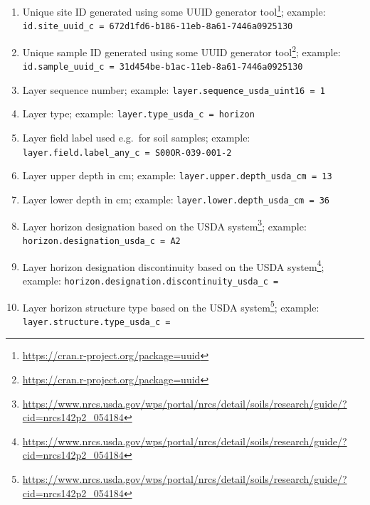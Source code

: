 \documentclass[
  graybox,natbib,nospthms]{svmono}
\providecommand{\tightlist}{%
  \setlength{\itemsep}{0pt}\setlength{\parskip}{0pt}}
\providecommand{\tightlist}{\setlength{\itemsep}{0pt}\setlength{\parskip}{0pt}}
\renewcommand{\href}[2]{#2 (\url{#1})}
\renewcommand{\href}[2]{#2\footnote{\url{#1}}}
\begin{document}
\begin{enumerate}
\def\labelenumi{\arabic{enumi}.}
\tightlist
\item
  Unique site ID generated using some \href{https://cran.r-project.org/package=uuid}{UUID generator tool}; example: \texttt{id.site\_uuid\_c\ =\ \textquotesingle{}672d1fd6-b186-11eb-8a61-7446a0925130\textquotesingle{}}\\
\item
  Unique sample ID generated using some \href{https://cran.r-project.org/package=uuid}{UUID generator tool}; example: \texttt{id.sample\_uuid\_c\ =\ \textquotesingle{}31d454be-b1ac-11eb-8a61-7446a0925130\textquotesingle{}}\\
\item
  Layer sequence number; example: \texttt{layer.sequence\_usda\_uint16\ =\ \textquotesingle{}1\textquotesingle{}}\\
\item
  Layer type; example: \texttt{layer.type\_usda\_c\ =\ \textquotesingle{}horizon\textquotesingle{}}\\
\item
  Layer field label used e.g.~for soil samples; example: \texttt{layer.field.label\_any\_c\ =\ \textquotesingle{}S00OR-039-001-2\textquotesingle{}}\\
\item
  Layer upper depth in cm; example: \texttt{layer.upper.depth\_usda\_cm\ =\ \textquotesingle{}13\textquotesingle{}}\\
\item
  Layer lower depth in cm; example: \texttt{layer.lower.depth\_usda\_cm\ =\ \textquotesingle{}36\textquotesingle{}}\\
\item
  Layer horizon designation \href{https://www.nrcs.usda.gov/wps/portal/nrcs/detail/soils/research/guide/?cid=nrcs142p2_054184}{based on the USDA system}; example: \texttt{horizon.designation\_usda\_c\ =\ \textquotesingle{}A2\textquotesingle{}}\\
\item
  Layer horizon designation discontinuity \href{https://www.nrcs.usda.gov/wps/portal/nrcs/detail/soils/research/guide/?cid=nrcs142p2_054184}{based on the USDA system}; example: \texttt{horizon.designation.discontinuity\_usda\_c\ =\ \textquotesingle{}\textquotesingle{}}\\
\item
  Layer horizon structure type \href{https://www.nrcs.usda.gov/wps/portal/nrcs/detail/soils/research/guide/?cid=nrcs142p2_054184}{based on the USDA system}; example: \texttt{layer.structure.type\_usda\_c\ =\ \textquotesingle{}\textquotesingle{}}\\

\end{enumerate}
\end{document}
